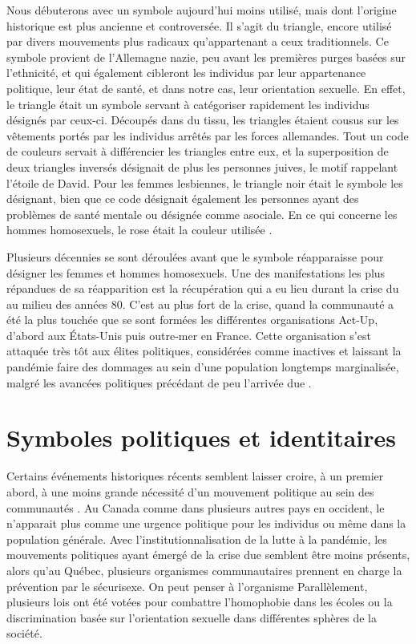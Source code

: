 Nous débuterons avec un symbole aujourd'hui moins utilisé, mais dont l'origine historique est plus ancienne et controversée.
Il s'agit du triangle, encore utilisé par divers mouvements plus radicaux qu'appartenant a ceux traditionnels.
Ce symbole provient de l'Allemagne nazie, peu avant les premières purges basées sur l'ethnicité, et qui également cibleront les individus par leur appartenance politique, leur état de santé, et dans notre cas, leur orientation sexuelle.
En effet, le triangle était un symbole servant à catégoriser rapidement les individus désignés par ceux-ci.
Découpés dans du tissu, les triangles étaient cousus sur les vêtements portés par les individus arrêtés par les forces allemandes.
Tout un code de couleurs servait à différencier les triangles entre eux, et la superposition de deux triangles inversés désignait de plus les personnes juives, le motif rappelant l'étoile de David.
Pour les femmes lesbiennes, le triangle noir était le symbole les désignant, bien que ce code désignait également les personnes ayant des problèmes de santé mentale ou désignée comme asociale.
En ce qui concerne les hommes homosexuels, le rose était la couleur utilisée \missref{}.

Plusieurs décennies se sont déroulées avant que le symbole réapparaisse pour désigner les femmes et hommes homosexuels.
Une des manifestations les plus répandues de sa réapparition est la récupération qui a eu lieu durant la crise du \vih{} au milieu des années 80.
C'est au plus fort de la crise, quand la communauté \lgbt{} a été la plus touchée que se sont formées les différentes organisations Act-Up, d'abord aux États-Unis puis outre-mer en France.
Cette organisation s'est attaquée très tôt aux élites politiques, considérées comme inactives et laissant la pandémie faire des dommages au sein d'une population longtemps marginalisée, malgré les avancées politiques précédant de peu l'arrivée due \vih{}.

\section{Symboles politiques et identitaires}
\label{sec:symboles_politiques_et_identitaire}
Certains événements historiques récents semblent laisser croire, à un premier abord, à une moins grande nécessité d'un mouvement politique au sein des communautés \lgbt{}.
Au Canada comme dans plusieurs autres pays en occident, le \sida{} n'apparait plus comme une urgence politique pour les individus \lgbt{} ou même dans la population générale. 
Avec l'institutionnalisation de la lutte à la pandémie, les mouvements politiques ayant  émergé de la crise due \vih{} semblent être moins présents, alors qu'au Québec, plusieurs organismes communautaires prennent en charge la prévention par le sécurisexe.
On peut penser à l'organisme \miels{}
Parallèlement, plusieurs lois ont été votées pour combattre l'homophobie dans les écoles ou la discrimination basée sur l'orientation sexuelle dans différentes sphères de la société.

